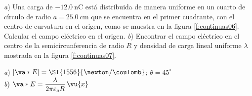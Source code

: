 \begin{Exercise}\label{p:continuas06}
  \textbf{} \textit{a}) Una carga de $\SI{-12.0}{\nano\coulomb}$ está distribuida de manera uniforme en un cuarto de círculo de radio $a = \SI{25.0}{\centi\metre}$ que se encuentra en el primer cuadrante, con el centro de curvatura en el origen, como se muestra en la figura \ref{f:continuas06}. Calcular el campo eléctrico en el origen. \textit{b}) Encontrar el campo eléctrico en el centro de la semicircunferencia de radio $R$ y densidad de carga lineal uniforme $\lambda$ mostrada en la figura \ref{f:continuas07}.
\end{Exercise}
\begin{Answer}
  \begin{minipage}[t]{.4\textwidth}
    \textit{a}) $|\va*{E}| = \SI{1556}{\newton/\coulomb}$; $\theta = 45^\circ$\\ \textit{b}) $\va*{E} = \dfrac{\lambda}{2\pi\varepsilon_o R}\,\vu{x}$
  \end{minipage}
\end{Answer}
%
\begin{center}
\end{center}
%
\begin{center}
\end{center}
%
